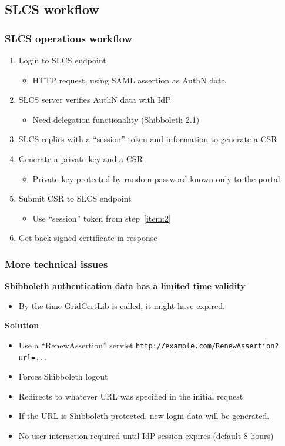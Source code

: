 \documentclass{beamer}
\newcommand{\+}{\vspace{1em}}
\begin{document}
\subsection{SLCS workflow}

\begin{frame}[label=more-slcs]
  \frametitle{SLCS operations workflow}
  \begin{enumerate}
  \item Login to SLCS endpoint
    \begin{itemize}
    \item HTTP request, using SAML assertion as AuthN data
    \end{itemize}
  \item SLCS server verifies AuthN data with IdP
    \begin{itemize}
    \item Need delegation functionality (Shibboleth 2.1)
    \end{itemize}
  \item\label{item:2} SLCS replies with a ``session'' token and information
    to generate a CSR
  \item Generate a private key and a CSR
    \begin{itemize}
    \item Private key protected by random password known only to the portal
    \end{itemize}
  \item Submit CSR to SLCS endpoint
    \begin{itemize}
    \item Use ``session'' token from step~\ref{item:2}
    \end{itemize}
  \item Get back signed certificate in response
  \end{enumerate}

  \+
  \hyperlink{slcs}{}
\end{frame}


\begin{frame}
  \frametitle{More technical issues}
  
  \textbf{Shibboleth authentication data has a limited time validity}
  \begin{itemize}
  \item By the time GridCertLib is called, it might have expired.
  \end{itemize}

  \+
  \textbf{Solution}
  \begin{itemize}
  \item Use a ``RenewAssertion'' servlet \texttt{http://example.com/RenewAssertion?url=...}
  \item Forces Shibboleth logout
  \item Redirects to whatever URL was specified in the initial request
  \item If the URL is Shibboleth-protected, new login data will be generated.
  \item No user interaction required until IdP session expires
    (default 8 hours)
  \end{itemize}
\end{frame}
\end{document}
